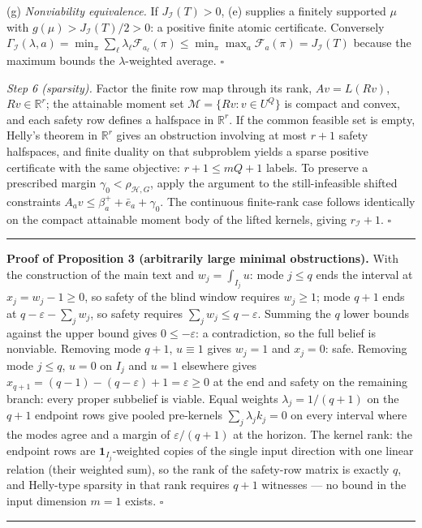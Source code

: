 \documentclass[10pt,article]{article}
\newcommand{\rulebar}{\begin{center}\rule{0.5\linewidth}{0.5pt}\end{center}}
\begin{document}
(g) \emph{Nonviability equivalence.} If \(J_{\mathcal I}(T) > 0\), (e)
supplies a finitely supported \(\mu\) with
\(g(\mu) > J_{\mathcal I}(T)/2 > 0\): a positive finite atomic
certificate. Conversely
\(\Gamma_{\mathcal I}(\lambda, a) = \min_\pi \sum_\ell
\lambda_\ell \mathcal F_{a_\ell}(\pi) \le \min_\pi \max_a
\mathcal F_a(\pi) = J_{\mathcal I}(T)\) because the maximum bounds the
\(\lambda\)-weighted average. \(\square\)

\emph{Step 6 (sparsity).} Factor the finite row map through its rank,
\(A v = L(Rv)\), \(Rv \in \mathbb R^{r}\); the attainable moment set
\(\mathcal M = \{Rv : v \in U^{Q}\}\) is compact and convex, and each safety
row defines a halfspace in \(\mathbb R^{r}\). If the common feasible set is
empty, Helly's theorem in \(\mathbb R^{r}\) gives an obstruction involving at
most \(r + 1\) safety halfspaces, and finite duality on that subproblem
yields a sparse positive certificate with the same objective: \(r + 1 \le mQ
+ 1\) labels. To preserve a prescribed margin \(\gamma_0 < \rho_{\mathcal
H,G}\), apply the argument to the still-infeasible shifted constraints \(A_a
v \le \beta_a^{+} + \bar e_a + \gamma_0\). The continuous finite-rank case
follows identically on the compact attainable moment body of the lifted
kernels, giving \(r_{\mathcal I} + 1\). \hfill\(\square\)
\rulebar

\textbf{Proof of Proposition 3 (arbitrarily large minimal obstructions).}
With the construction of the main text and \(w_j = \int_{I_j} u\): mode
\(j \le q\) ends the interval at \(x_j = w_j - 1 \ge 0\), so safety of the
blind window requires \(w_j \ge 1\); mode \(q+1\) ends at \(q - \varepsilon -
\sum_j w_j\), so safety requires \(\sum_j w_j \le q - \varepsilon\). Summing
the \(q\) lower bounds against the upper bound gives \(0 \le -\varepsilon\):
a contradiction, so the full belief is nonviable. Removing mode \(q+1\),
\(u \equiv 1\) gives \(w_j = 1\) and \(x_j = 0\): safe. Removing mode \(j \le
q\), \(u = 0\) on \(I_j\) and \(u = 1\) elsewhere gives \(x_{q+1} =
(q-1) - (q - \varepsilon) + 1 = \varepsilon \ge 0\) at the end and safety on
the remaining branch: every proper subbelief is viable. Equal weights
\(\lambda_j = 1/(q{+}1)\) on the \(q+1\) endpoint rows give pooled pre-kernels
\(\sum_j \lambda_j k_j = 0\) on every interval where the modes agree and a
margin of \(\varepsilon/(q{+}1)\) at the horizon. The kernel rank: the
endpoint rows are \(\mathbf 1_{I_j}\)-weighted copies of the single input
direction with one linear relation (their weighted sum), so the rank of the
safety-row matrix is exactly \(q\), and Helly-type sparsity in that rank
requires \(q + 1\) witnesses --- no bound in the input dimension \(m = 1\)
exists. \hfill\(\square\)
\rulebar
\end{document}
